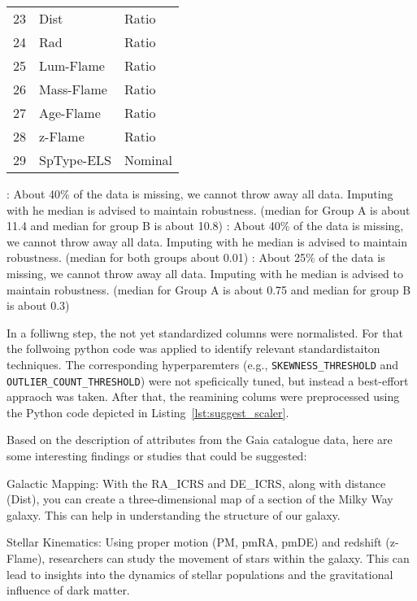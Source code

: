 \begin{table}[]
\begin{tabular}{lll}
23          & Dist                 & Ratio                   \\
24          & Rad                  & Ratio                   \\
25          & Lum-Flame            & Ratio                   \\
26          & Mass-Flame           & Ratio                   \\
27          & Age-Flame            & Ratio                   \\
28          & z-Flame              & Ratio                   \\
29          & SpType-ELS           & Nominal                 \\
\hline
\end{tabular}
\end{table}


: About 40\% of the data is missing, we cannot throw away all data. Imputing with he median is advised to maintain robustness. (median for Group A is about 11.4 and median for group B is about 10.8)
: About 40\% of the data is missing, we cannot throw away all data. Imputing with he median is advised to maintain robustness. (median for both groups about 0.01)
: About 25\% of the data is missing, we cannot throw away all data. Imputing with he median is advised to maintain robustness. (median for Group A is about 0.75 and median for group B is about 0.3)


In a folliwng step, the not yet standardized columns were normalisted. For that the follwoing python code was applied to identify relevant standardistaiton techniques. The corresponding hyperparemters (e.g., \texttt{SKEWNESS\_THRESHOLD} and \texttt{OUTLIER\_COUNT\_THRESHOLD}) were not speficically tuned, but instead a best-effort appraoch was taken. After that, the reamining colums were preprocessed using the Python code depicted in Listing~\ref{lst:suggest_scaler}.





Based on the description of attributes from the Gaia catalogue data, here are some interesting findings or studies that could be suggested:

Galactic Mapping: With the RA_ICRS and DE_ICRS, along with distance (Dist), you can create a three-dimensional map of a section of the Milky Way galaxy. This can help in understanding the structure of our galaxy.

Stellar Kinematics: Using proper motion (PM, pmRA, pmDE) and redshift (z-Flame), researchers can study the movement of stars within the galaxy. This can lead to insights into the dynamics of stellar populations and the gravitational influence of dark matter.

